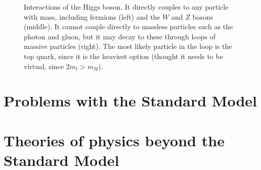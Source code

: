 \begin{figure}[ht]
  \addtolength{\abovecaptionskip}{5mm}
  \centering
  \vskip5mm
  
  
  
    \caption{Interactions of the Higgs boson. It directly couples to any particle with mass,
      including fermions (left) and the $W$ and $Z$ bosons (middle). It cannot couple directly
      to massless particles such as the photon and gluon, but it may decay to these through loops
      of massive particles (right). The most likely particle in the loop is the top quark, since
      it is the heaviest option (thought it needs to be virtual, since $2m_t > m_H$).
            }
    \label{fig:higgs_diagrams}
\end{figure}


\section{Problems with the Standard Model}

\section{Theories of physics beyond the Standard Model}
\label{sec:bsm}
